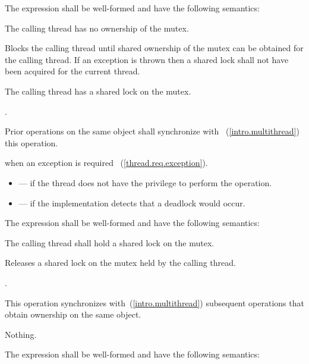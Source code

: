 \pnum
The expression  shall be well-formed and have the
following semantics:

\begin{itemdescr}
\pnum
\requires The calling thread has no ownership of the mutex.

\pnum
\effects Blocks the calling thread until shared ownership of the mutex can be obtained for the calling thread.
If an exception is thrown then a shared lock shall not have been acquired for the current thread.

\pnum
\postcondition The calling thread has a shared lock on the mutex.

\pnum
\returntype {}.

\pnum
\sync Prior  operations on the same object shall synchronize with ~(\ref{intro.multithread}) this operation.

\pnum
\throws {} when an exception is required ~(\ref{thread.req.exception}).

\pnum
\errors
\begin{itemize}
\item {} --- if the thread does not have the privilege to perform the operation.
\item {} --- if the implementation detects that a deadlock would occur.
\end{itemize}
\end{itemdescr}

\pnum
The expression  shall be well-formed and have the following semantics:

\begin{itemdescr}
\pnum
\requires The calling thread shall hold a shared lock on the mutex.

\pnum
\effects Releases a shared lock on the mutex held by the calling thread.

\pnum
\returntype {}.

\pnum
\sync This operation synchronizes with~(\ref{intro.multithread}) subsequent
 operations that obtain ownership on the same object.

\pnum
\throws Nothing.
\end{itemdescr}

\pnum
The expression  shall be well-formed and have the following semantics:

